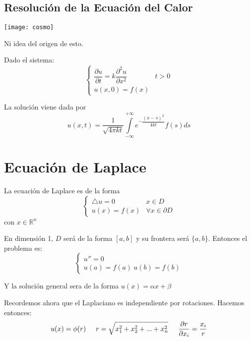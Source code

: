 \documentclass[openany]{book}
\begin{document}
\section{Resolución de la Ecuación del Calor}

\begin{minipage}[l]{0.1\textwidth}
  \texttt{[image: cosmo]}
  \end{minipage}
  \begin{minipage}[l]{0.8\textwidth}
  Ni idea del origen de esto.
\end{minipage}


Dado el sistema:
$$ \left\{
\begin{array}{ll}
  \dfrac{\partial u}{\partial t} = k \dfrac{\partial ^2u}{\partial x^2} & t>0 \\ 
  u(x,0) = f(x)
\end{array}
\right. $$

La solución viene dada por 
$$ u(x,t) = \dfrac{1}{\sqrt{4\pi kt}} \int\limits_{-\infty}^{+\infty} e^{-\dfrac{(x-s)^2}{4kt}}f(s)ds  $$


\chapter{Ecuación de Laplace}

\begin{definition}
  La ecuación de Laplace es de la forma
  $$ \left\{
  \begin{array}{ll}
    \bigtriangleup u = 0 & x \in D\\ 
    u(x) = f(x) & \forall x \in \partial D
  \end{array}
  \right. $$
  con $ x \in \mathbb{R}^{n} $
\end{definition}


\begin{example}
  En dimensión 1, $ D $ será de la forma $ [a,b] $ y su frontera será $ \{a,b\} $. Entonces el problema es:
  $$ \left\{
  \begin{array}{l}
    u''=0 \\ 
    u(a) = f(a)\ u(b) = f(b)
  \end{array}
  \right. $$

  Y la solución general sera de la forma $ u(x) = \alpha x + \beta  $
\end{example}

Recordemos ahora que el Laplaciano es independiente por rotaciones. Hacemos entonces:
$$ u(x) = \phi(r) \hspace{5mm}r = \sqrt{x_1^2+x_2^2+...+x_n^2} \hspace{5mm} \dfrac{\partial r}{\partial x_i} = \dfrac{x_i}{r} $$
\end{document}

